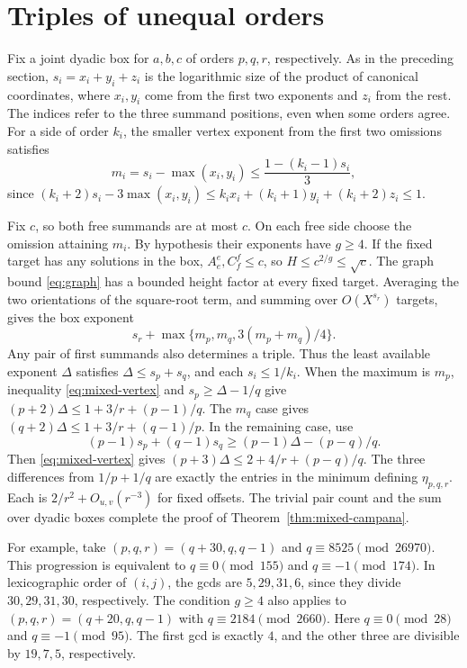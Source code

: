 \documentclass[11pt,reqno]{amsart}
\begin{document}
\section{Triples of unequal orders}
Fix a joint dyadic box for \(a,b,c\) of orders \(p,q,r\), respectively.
As in the preceding section, \(s_i=x_i+y_i+z_i\) is the logarithmic
size of the product of canonical coordinates, where \(x_i,y_i\)
come from the first two exponents and \(z_i\) from the rest.
The indices refer to the three summand positions, even when
some orders agree. For a side of order \(k_i\), the smaller
vertex exponent from the first two omissions satisfies
\begin{equation}\label{eq:mixed-vertex}
 m_i=s_i-\max(x_i,y_i)
 \le \frac{1-(k_i-1)s_i}{3},
\end{equation}
since
\((k_i+2)s_i-3\max(x_i,y_i)\le k_ix_i+(k_i+1)y_i+(k_i+2)z_i\le1\).

Fix \(c\), so both free summands are at most \(c\). On each free
side choose the omission attaining \(m_i\). By hypothesis their
exponents have \(g\ge4\). If the fixed target has any solutions in
the box, \(A_e^e,C_f^f\le c\), so \(H\le c^{2/g}\le\sqrt c\).
The graph bound \eqref{eq:graph} has a bounded height factor
at every fixed target. Averaging the two orientations of the
square-root term, and summing over \(O(X^{s_r})\) targets, gives
the box exponent
\[
              s_r+\max\{m_p,m_q,3(m_p+m_q)/4\}.
\]
Any pair of first summands also determines a triple. Thus the
least available exponent \(\Delta\) satisfies
\(\Delta\le s_p+s_q\), and each \(s_i\le1/k_i\).
When the maximum is \(m_p\), inequality \eqref{eq:mixed-vertex}
and \(s_p\ge\Delta-1/q\) give
\((p+2)\Delta\le1+3/r+(p-1)/q\). The \(m_q\) case gives
\((q+2)\Delta\le1+3/r+(q-1)/p\). In the remaining case, use
\[
             (p-1)s_p+(q-1)s_q
                  \ge (p-1)\Delta-(p-q)/q .
\]
Then \eqref{eq:mixed-vertex} gives
\((p+3)\Delta\le2+4/r+(p-q)/q\). The three differences from
\(1/p+1/q\) are exactly the entries in the minimum defining
\(\eta_{p,q,r}\). Each is \(2/r^2+O_{u,v}(r^{-3})\) for fixed offsets.
The trivial pair count and the sum over dyadic boxes complete the
proof of Theorem~\ref{thm:mixed-campana}.

For example, take \((p,q,r)=(q+30,q,q-1)\) and
\(q\equiv8525\pmod{26970}\). This progression is equivalent to
\(q\equiv0\pmod{155}\) and \(q\equiv-1\pmod{174}\). In lexicographic
order of \((i,j)\), the gcds are \(5,29,31,6\), since they divide
\(30,29,31,30\), respectively.
The condition \(g\ge4\) also applies to
\((p,q,r)=(q+20,q,q-1)\) with \(q\equiv2184\pmod{2660}\).
Here \(q\equiv0\pmod{28}\) and \(q\equiv-1\pmod{95}\).
The first gcd is exactly \(4\), and the other three are divisible
by \(19,7,5\), respectively.
\end{document}
